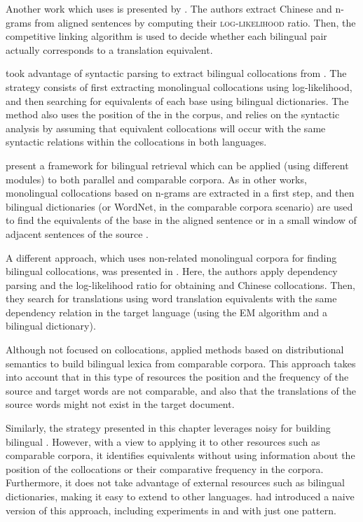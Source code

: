 \documentclass[output=paper
,modfonts
,nonflat]{langsci/langscibook}
\begin{document}
Another work which uses  is presented by \citet{wu2003}. The authors
extract Chinese and  n-grams from aligned sentences by computing their \textsc{log-likelihood} ratio.
Then, the competitive linking algorithm is used to decide whether each bilingual pair actually
corresponds to a translation equivalent.

\citet{seretan2007} took advantage of syntactic parsing to extract bilingual collocations from .
The strategy consists of first extracting monolingual collocations using log-likelihood,
and then searching for equivalents of each base using bilingual dictionaries.
The method also uses the position of the  in the corpus, and relies on the syntactic analysis
by assuming that equivalent collocations will occur with the same syntactic relations within the collocations in both languages.

\citet{Rivera2013} present a framework for bilingual  retrieval
which can be applied (using different modules) to both parallel and comparable corpora.
As in other works, monolingual collocations based on n-grams are extracted in a first
step, and then bilingual dictionaries (or WordNet, in the comparable corpora scenario) are used
to find the equivalents of the base in the aligned sentence or in a small window of
adjacent sentences of the source .

A different approach, which uses non-related monolingual corpora for finding bilingual
collocations, was presented in \citet{lu2004}. Here, the authors apply dependency parsing
and the log-likelihood ratio for obtaining  and Chinese collocations. Then,
they search for translations using word translation equivalents with the same dependency
relation in the target language (using the EM algorithm and a bilingual dictionary).

Although not focused on collocations, \citet{fung1998} applied methods based on distributional
semantics to build bilingual lexica from comparable corpora.
This approach takes into account that in this type of resources the position and the frequency
of the source and target words are not comparable, and also that the translations of the source
words might not exist in the target document.

Similarly, the strategy presented in this chapter leverages noisy  for building
bilingual . However, with a view to applying it to other resources such as comparable corpora, it identifies equivalents without using information about the position of the collocations
or their comparative frequency in the corpora. Furthermore, it does not take advantage
of external resources such as bilingual dictionaries, making it easy to extend to other languages.
\citet{pacorbook} had introduced a naive version of this approach, including experiments in  and  with just one  pattern.
\end{document}
